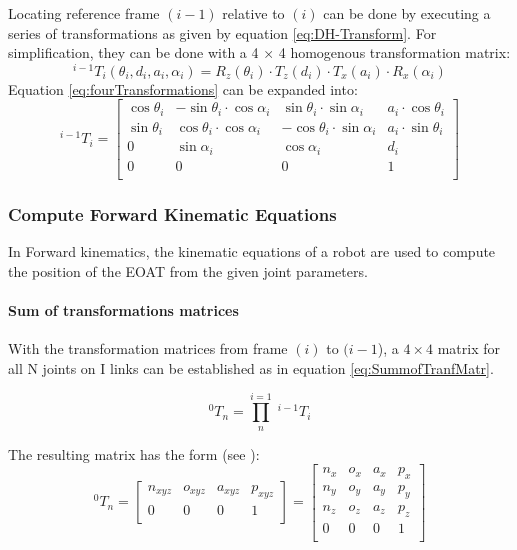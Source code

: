 Locating reference frame $(i-1)$ relative to $(i)$ can be done by executing a series of transformations as given by equation \ref{eq:DH-Transform}. 
For simplification, they can be done with a 4 × 4 homogenous transformation matrix:
\begin{equation} \label{eq:fourTransformations}
^{i-1}T_i(\theta_i,d_i,a_i,\alpha_i)=R_z(\theta_i) \cdot T_z(d_i) \cdot T_x(a_i) \cdot R_x(\alpha_i)
\end{equation}
Equation \ref{eq:fourTransformations} can be expanded into:
\begin{equation}\label{eq:TransformationMarix}
^{i-1}T_i=
\begin{bmatrix}
\cos\theta_i & -\sin\theta_i \cdot \cos\alpha_i & \sin\theta_i \cdot \sin\alpha_i & a_i \cdot \cos\theta_i \\
\sin\theta_i & \cos\theta_i \cdot \cos\alpha_i & -\cos\theta_i \cdot \sin\alpha_i & a_i \cdot \sin\theta_i \\ %
0 & \sin\alpha_i & \cos\alpha_i & d_i \\
0 & 0 & 0 & 1 \\
\end{bmatrix}
\end{equation}



\subsubsection{Compute Forward Kinematic Equations} \label{ForKinEq}
In Forward kinematics, the kinematic equations of a robot are used to compute the position of the \ac{EOAT} from the given joint parameters.

\paragraph{Sum of transformations matrices}
With the transformation matrices from frame $(i)$ to $(i-1$), a $4\times4$ matrix for all \gls{N} joints on \gls{I} links can be established as in equation \ref{eq:SummofTranfMatr}.

\begin{equation} \label{eq:SummofTranfMatr}
^0T_n=\prod_{n}^{i=1} \phantom{.}^{i-1}T_i
\end{equation}


The resulting matrix has the form (see \cite{invKinSolYanWu}):
\begin{equation}\label{eq:matrixForm}
^0T_n=
\begin{bmatrix}
n_{xyz} & o_{xyz} & a_{xyz} & p_{xyz} \\
0 & 0 & 0 & 1 \\
\end{bmatrix}
=
\begin{bmatrix}
n_x & o_x & a_x & p_x \\
n_y & o_y & a_y & p_y \\ %
n_z & o_z & a_z & p_z \\
0 & 0 & 0 & 1 \\
\end{bmatrix}
\end{equation}

